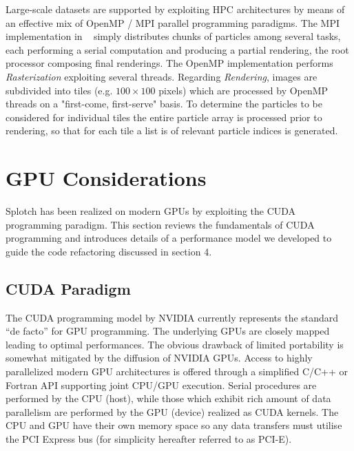 \documentclass[1p]{elsarticle}
\begin{document}
Large-scale datasets are supported by exploiting HPC architectures by means of an effective mix of OpenMP / MPI parallel programming paradigms. The MPI implementation in ~\cite{jin:high-performance}  simply distributes chunks of particles among several tasks, each performing a serial computation and producing a partial rendering, the root processor composing final renderings. The OpenMP implementation performs {\it Rasterization} exploiting several threads. Regarding {\it Rendering}, images are subdivided into tiles (e.g. $100 \times 100$ pixels) which are processed by OpenMP threads on a "first-come, first-serve" basis. To determine the particles to be considered for individual tiles the entire particle array is processed prior to rendering, so that for each tile a list is of relevant particle indices is generated.


\section{GPU Considerations}
\label{sec:gpu-code}

Splotch has been realized on modern GPUs by exploiting the CUDA programming paradigm. This section reviews the fundamentals of CUDA programming and introduces details of a performance model we developed to guide the code refactoring discussed in section 4.  

\subsection{CUDA Paradigm} 
\label{sec:cuda}

The CUDA programming model \cite{cudaurl} by NVIDIA currently represents the standard ``de facto'' for GPU programming. The underlying GPUs are closely mapped leading to optimal performances. The obvious drawback of limited portability is somewhat mitigated by the diffusion of NVIDIA GPUs. Access to highly parallelized modern GPU architectures is offered through a simplified C/C++ or Fortran API supporting joint CPU/GPU execution. Serial procedures are performed by the CPU (host), while those which exhibit rich amount of data parallelism are performed by the GPU (device) realized as CUDA kernels. The CPU and GPU have their own memory space so any data transfers must utilise the PCI Express bus (for simplicity hereafter referred to as PCI-E). 
\end{document}
